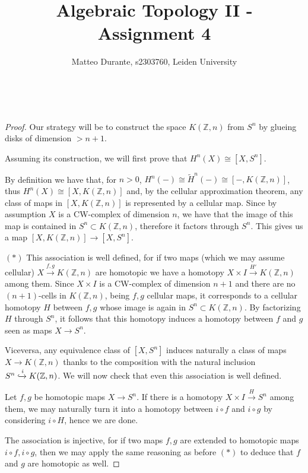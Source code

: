 \documentclass{article}
\newcommand{\numberset}{\mathbb}
\newcommand{\Z}{\numberset{Z}}
\newcommand{\exercise}[1]{\noindent {\bf Exercise #1}}
\begin{document}
\title{Algebraic Topology II - Assignment 4}

\author{Matteo Durante, s2303760, Leiden University}

\maketitle


~\\
\exercise{3}

\begin{proof}
    Our strategy will be to construct the space $K(\Z,n)$ from $S^n$ by glueing
    disks of dimension $>n+1$.
    
    Assuming its construction, we will first prove that $H^n(X)\cong[X,S^n]$.
    
    By definition we have that, for $n>0$,
    $H^n(-)\cong \tilde{H}^n(-)\cong [-,K(\Z,n)]$, thus $H^n(X)\cong[X,K(\Z,n)]$
    and, by the cellular
    approximation theorem, any class of maps in $[X,K(\Z,n)]$ is represented by
    a cellular map. Since by assumption $X$ is a CW-complex of dimension $n$, we
    have that the image of this map is contained in $S^n\subset K(\Z,n)$,
    therefore it factors through $S^n$. This gives us a map
    $[X,K(\Z,n)]\rightarrow[X,S^n]$.
    
    $(*)$ This association is well defined, for if two maps (which we may assume
    cellular) $X\xrightarrow{f,g}K(\Z,n)$ are homotopic we have a homotopy $X\times I
    \xrightarrow{H'} K(\Z,n)$ among them. Since $X\times I$ is a CW-complex of
    dimension $n+1$ and there are no
    $(n+1)$-cells in $K(\Z,n)$, being $f,g$ cellular maps, it corresponds to a
    cellular homotopy $H$ between $f,g$ whose image is again in $S^n\subset
    K(\Z,n)$. By factorizing $H$ through $S^n$, it follows that this homotopy
    induces a homotopy between $f$ and $g$ seen as maps $X\rightarrow S^n$.

    Viceversa, any equivalence class of $[X,S^n]$ induces naturally a
    class of maps $X\rightarrow K(\Z,n)$ thanks to the composition with the
    natural inclusion $S^n\xhookrightarrow{i} K(\Z,n)$. We will now check that
    even this association is well defined.
    
    Let $f,g$ be homotopic maps $X\rightarrow S^n$. If there is a homotopy
    $X\times I\xrightarrow{H}S^n$ among them, we
    may naturally turn it into a homotopy between $i\circ f$ and $i\circ g$ by
    considering $i\circ H$, hence we are done.

    The association is injective, for if two maps $f,g$ are extended to
    homotopic maps $i\circ f,i\circ g$, then we may apply the same reasoning as
    before $(*)$ to deduce that $f$ and $g$ are homotopic as well.


\end{proof}
\end{document}
